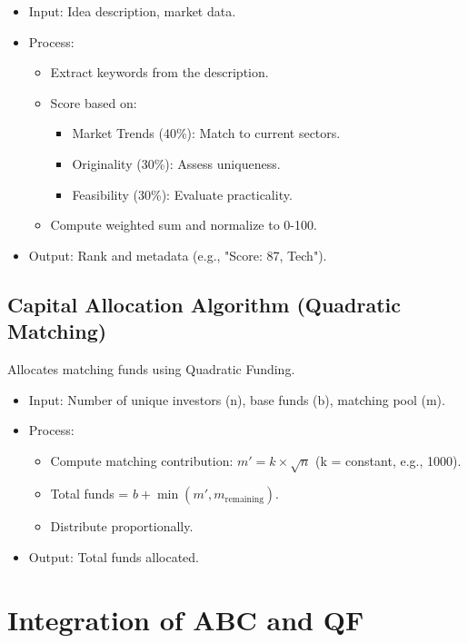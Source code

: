 \documentclass[12pt]{article}
\begin{document}
\begin{itemize}
    \item Input: Idea description, market data.
    \item Process:
          \begin{itemize}
              \item Extract keywords from the description.
              \item Score based on:
                    \begin{itemize}
                        \item Market Trends (40\%): Match to current sectors.
                        \item Originality (30\%): Assess uniqueness.
                        \item Feasibility (30\%): Evaluate practicality.
                    \end{itemize}
              \item Compute weighted sum and normalize to 0-100.
          \end{itemize}
    \item Output: Rank and metadata (e.g., "Score: 87, Tech").
\end{itemize}

\subsection{Capital Allocation Algorithm (Quadratic Matching)}
Allocates matching funds using Quadratic Funding.

\begin{itemize}
    \item Input: Number of unique investors (n), base funds (b), matching pool (m).
    \item Process:
          \begin{itemize}
              \item Compute matching contribution: \( m' = k \times \sqrt{n} \) (k = constant, e.g., 1000).
              \item Total funds = \( b + \min(m', m_{\text{remaining}}) \).
              \item Distribute proportionally.
          \end{itemize}
    \item Output: Total funds allocated.
\end{itemize}

\section{Integration of ABC and QF}
\end{document}
